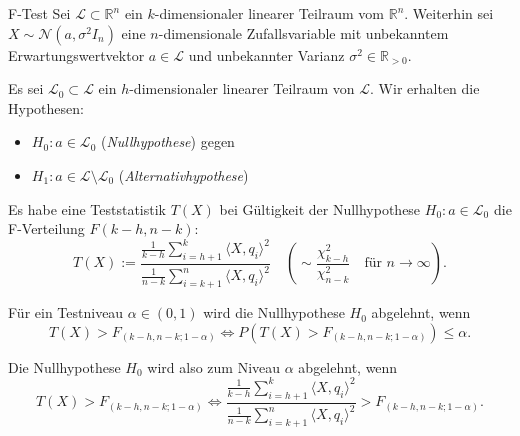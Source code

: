 \begin{defi}{F-Test}
    Sei $\mathcal{L} \subset \mathbb{R}^n$ ein $k$-dimensionaler linearer Teilraum vom $\mathbb{R}^n$.
    Weiterhin sei $X \sim \mathcal{N}(a, \sigma^2 I_n)$ eine $n$-dimensionale Zufallsvariable mit unbekanntem Erwartungswertvektor $a \in \mathcal{L}$ und unbekannter Varianz $\sigma^2 \in \mathbb{R}_{> 0}$.

    Es sei $\mathcal{L}_0 \subset \mathcal{L}$ ein $h$-dimensionaler linearer Teilraum von $\mathcal{L}$.
    Wir erhalten die Hypothesen:
    \begin{itemize}
        \item $H_0: a \in \mathcal{L}_0$ (\emph{Nullhypothese}) gegen
        \item $H_1: a \in \mathcal{L} \setminus \mathcal{L}_0$ (\emph{Alternativhypothese})
    \end{itemize}

    Es habe eine Teststatistik $T(X)$ bei Gültigkeit der Nullhypothese $H_0: a \in \mathcal{L}_0$ die F-Verteilung $F(k - h, n - k)$:
    \[
        T(X) := \frac{\frac{1}{k - h} \sum_{i = h + 1}^{k} \langle X, q_i \rangle^2}{\frac{1}{n - k} \sum_{i = k + 1}^{n} \langle X, q_i \rangle^2} \quad \left( \sim \frac{\chi^2_{k - h}}{\chi^2_{n - k}} \quad \text{für } n \to \infty \right).
    \]

    Für ein Testniveau $\alpha \in (0, 1)$ wird die Nullhypothese $H_0$ abgelehnt, wenn
    \[
        T(X) > F_{(k - h, n - k; 1 - \alpha)} \iff P(T(X) > F_{(k - h, n - k; 1 - \alpha)}) \leq \alpha.
    \]

    Die Nullhypothese $H_0$ wird also zum Niveau $\alpha$ abgelehnt, wenn
    \[
        T(X) > F_{(k - h, n - k; 1 - \alpha)} \iff \frac{\frac{1}{k - h} \sum_{i = h + 1}^{k} \langle X, q_i \rangle^2}{\frac{1}{n - k} \sum_{i = k + 1}^{n} \langle X, q_i \rangle^2} > F_{(k - h, n - k; 1 - \alpha)}.
    \]
\end{defi}

